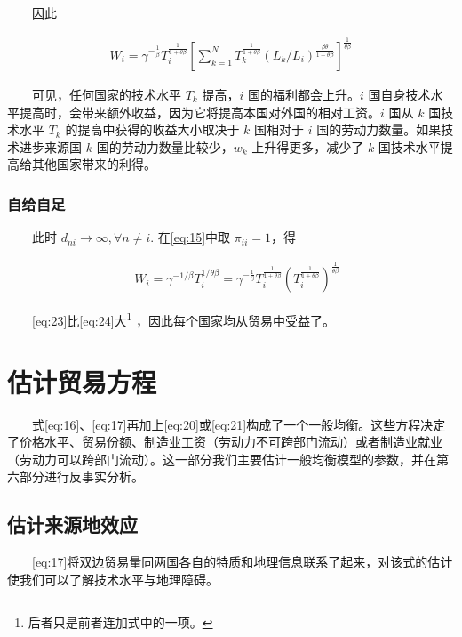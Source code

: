 \documentclass[]{article}
\let\rmarkdownfootnote\footnote%
\def\footnote{\protect\rmarkdownfootnote}
\begin{document}
　　因此

\begin{align}
W_{i}=\gamma^{-\frac{1}{\beta}} T_{i}^{\frac{1}{1+\theta \beta}}\left[\sum_{k=1}^{N} T_{k}^{\frac{1}{1+\theta \beta}}\left(L_{k} / L_{i}\right)^{\frac{\beta \theta}{1+\theta \beta}}\right]^{\frac{1}{\theta \beta}} \label{eq:23}
\end{align}

　　可见，任何国家的技术水平 \(T_k\) 提高，\(i\) 国的福利都会上升。\(i\) 国自身技术水平提高时，会带来额外收益，因为它将提高本国对外国的相对工资。\(i\) 国从 \(k\) 国技术水平 \(T_k\) 的提高中获得的收益大小取决于 \(k\) 国相对于 \(i\) 国的劳动力数量。如果技术进步来源国 \(k\) 国的劳动力数量比较少，\(w_k\) 上升得更多，减少了 \(k\) 国技术水平提高给其他国家带来的利得。

\hypertarget{section-22}{%
\subsubsection{自给自足}\label{section-22}}

　　此时 \(d_{n i} \rightarrow \infty, \forall n \neq i\). 在\eqref{eq:15}中取 \(\pi_{ii}=1\)，得

\begin{align}
\quad W_{i}=\gamma^{-1 / \beta} T_{i}^{1 / \theta \beta}=\gamma^{-\frac{1}{\beta}} T_{i}^{\frac{1}{1+\theta \beta}}\left(T_{i}^{\frac{1}{1+\theta \beta}}\right)^{\frac{1}{\theta \beta}} \label{eq:24}
\end{align}

　　\eqref{eq:23}比\eqref{eq:24}大\footnote{后者只是前者连加式中的一项。} ，因此每个国家均从贸易中受益了。

\hypertarget{section-23}{%
\section{估计贸易方程}\label{section-23}}

　　式\eqref{eq:16}、\eqref{eq:17}再加上\eqref{eq:20}或\eqref{eq:21}构成了一个一般均衡。这些方程决定了价格水平、贸易份额、制造业工资（劳动力不可跨部门流动）或者制造业就业（劳动力可以跨部门流动）。这一部分我们主要估计一般均衡模型的参数，并在第六部分进行反事实分析。

\hypertarget{section-24}{%
\subsection{估计来源地效应}\label{section-24}}

　　\eqref{eq:17}将双边贸易量同两国各自的特质和地理信息联系了起来，对该式的估计使我们可以了解技术水平与地理障碍。
\end{document}

